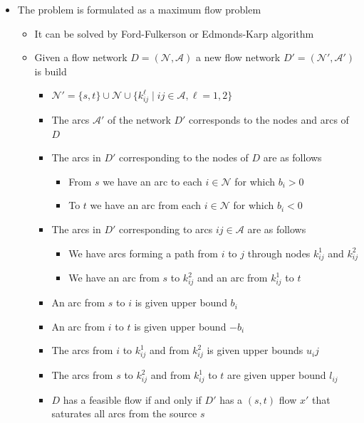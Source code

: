 \documentclass[11pt]{article}
\begin{document}
\begin{enumerate}
\begin{itemize}
\item The problem is formulated as a maximum flow problem
\begin{itemize}
\item It can be solved by Ford-Fulkerson or Edmonds-Karp algorithm
\item Given a flow network \(D=(\mathcal N, \mathcal A)\) a new flow network \(D' = (\mathcal N', \mathcal A')\) is build
\begin{itemize}
\item \(\mathcal N' = \{s,t\} \cup \mathcal N \cup \{k_{ij}^\ell \mid ij \in \mathcal A, \ell = 1,2\}\)
\item The arcs \(\mathcal A'\) of the network \(D'\) corresponds to the nodes and arcs of \(D\)
\item The arcs in \(D'\) corresponding to the nodes of \(D\) are as follows
\begin{itemize}
\item From \(s\) we have an arc to each \(i \in \mathcal N\) for which \(b_i > 0\)
\item To \(t\) we have an arc from each \(i \in \mathcal N\) for which \(b_i < 0\)
\end{itemize}
\item The arcs in \(D'\) corresponding to arcs \(ij \in \mathcal A\) are as follows
\begin{itemize}
\item We have arcs forming a path from \(i\) to \(j\) through nodes \(k_{ij}^1\) and \(k_{ij}^2\)
\item We have an arc from \(s\) to \(k_{ij}^2\) and an arc from \(k_{ij}^1\) to \(t\)
\end{itemize}
\item An arc from \(s\) to \(i\) is given upper bound \(b_i\)
\item An arc from \(i\) to \(t\) is given upper bound \(-b_i\)
\item The arcs from \(i\) to \(k_{ij}^1\) and from \(k_{ij}^2\) is given upper bounds \(u_ij\)
\item The arcs from \(s\) to \(k_{ij}^2\) and from \(k_{ij}^1\) to \(t\) are given upper bound \(l_{ij}\)
\item \(D\) has a feasible flow if and only if \(D'\) has a \((s,t)\) flow \(x'\) that saturates all arcs from the source \(s\)
\end{itemize}
\end{itemize}
\end{itemize}


\end{enumerate}
\end{document}
